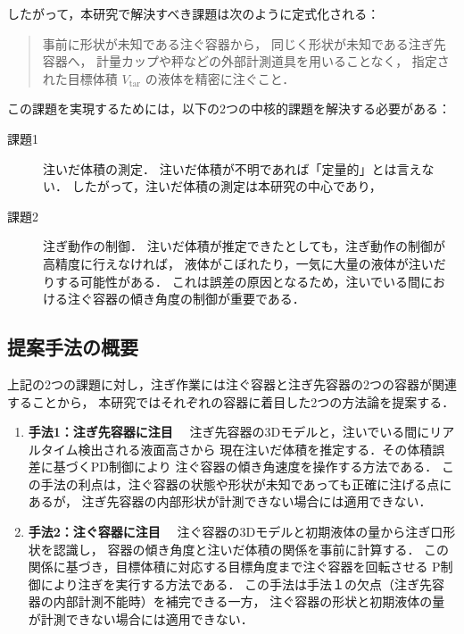 したがって，本研究で解決すべき課題は次のように定式化される：

\begin{quote}
  事前に形状が未知である注ぐ容器から，
  同じく形状が未知である注ぎ先容器へ，
  計量カップや秤などの外部計測道具を用いることなく，
  指定された目標体積 $V_{\mathrm{tar}}$ の液体を精密に注ぐこと．
\end{quote}

この課題を実現するためには，以下の2つの中核的課題を解決する必要がある：

\begin{description}
  \item[課題1] 注いだ体積の測定．
    注いだ体積が不明であれば「定量的」とは言えない．
    したがって，注いだ体積の測定は本研究の中心であり，
  \item[課題2] 注ぎ動作の制御．
    注いだ体積が推定できたとしても，注ぎ動作の制御が高精度に行えなければ，
    液体がこぼれたり，一気に大量の液体が注いだりする可能性がある．
    これは誤差の原因となるため，注いでいる間における注ぐ容器の傾き角度の制御が重要である．
\end{description}


\subsection{提案手法の概要}

上記の2つの課題に対し，注ぎ作業には注ぐ容器と注ぎ先容器の2つの容器が関連することから，
本研究ではそれぞれの容器に着目した2つの方法論を提案する．

\begin{enumerate}
  \item \textbf{手法1：注ぎ先容器に注目} 
    　注ぎ先容器の3Dモデルと，注いでいる間にリアルタイム検出される液面高さから
    現在注いだ体積を推定する．その体積誤差に基づくPD制御により
    注ぐ容器の傾き角速度を操作する方法である．
    この手法の利点は，注ぐ容器の状態や形状が未知であっても正確に注げる点にあるが，
    注ぎ先容器の内部形状が計測できない場合には適用できない．
  
  \item \textbf{手法2：注ぐ容器に注目} 
    　注ぐ容器の3Dモデルと初期液体の量から注ぎ口形状を認識し，
    容器の傾き角度と注いだ体積の関係を事前に計算する．
    この関係に基づき，目標体積に対応する目標角度まで注ぐ容器を回転させる
    P制御により注ぎを実行する方法である．
    この手法は手法１の欠点（注ぎ先容器の内部計測不能時）を補完できる一方，
    注ぐ容器の形状と初期液体の量が計測できない場合には適用できない．
\end{enumerate}

